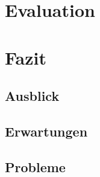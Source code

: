 \chapter{Evaluation}


\chapter{Fazit}

\section{Ausblick}

\section{Erwartungen}

\section{Probleme}